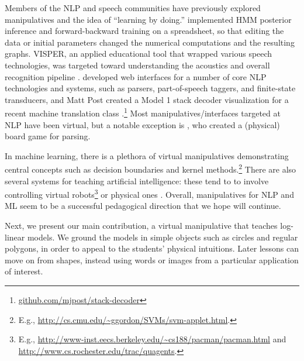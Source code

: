 \documentclass[11pt,letterpaper]{article}
\newcommand{\Note}[1]{}
\renewcommand{\Note}[1]{\hl{[#1]}}  %
\newcommand{\NoteSigned}[3]{{\sethlcolor{#2}\Note{#1: #3}}}
\newcommand{\NoteJE}[1]{\NoteSigned{JE}{LightGreen}{#1}}
\newcommand{\Commented}[1]{#1}
\begin{document}

Members of the NLP and speech communities have previously explored manipulatives and the idea of
``learning by doing.''
 implemented HMM posterior inference and
forward-backward training on a spreadsheet, so that editing the data or initial parameters
changed the numerical computations and the resulting graphs.  
VISPER, an applied educational tool that wrapped various speech technologies, 
was targeted toward understanding the acoustics and overall recognition pipeline 
\cite{nouza1997educational}. 
 developed web interfaces for a number of core NLP technologies and systems, such as parsers, part-of-speech 
taggers, and finite-state transducers, and Matt Post created a Model 1 stack decoder visualization for a recent machine translation class \cite{lopez2013learning}.\footnote{\url{github.com/mjpost/stack-decoder}}
Most manipulatives/interfaces targeted at NLP have been virtual, but a notable exception is , 
who created a (physical) board game for parsing. 

In machine learning, there is a plethora of virtual manipulatives demonstrating central concepts such 
as decision boundaries and kernel
methods.\footnote{E.g.,
  \url{http://cs.cmu.edu/~ggordon/SVMs/svm-applet.html}.
}
There are also several systems for teaching artificial intelligence: these tend to to involve controlling 
virtual robots\footnote{E.g., \url{http://www-inst.eecs.berkeley.edu/~cs188/pacman/pacman.html} and 
\url{http://www.cs.rochester.edu/trac/quagents}.}
or physical ones \cite{tokic2012robot}.
Overall, manipulatives for NLP and ML seem to be a successful
pedagogical direction that we hope will continue.

Next, we present our main contribution, a virtual manipulative that teaches log-linear models. We ground 
the models in simple objects such as circles and regular polygons, in order to appeal to the 
students' physical intuitions.  Later lessons can move on 
from shapes, instead using words or images from a particular
application of interest.
\end{document}
